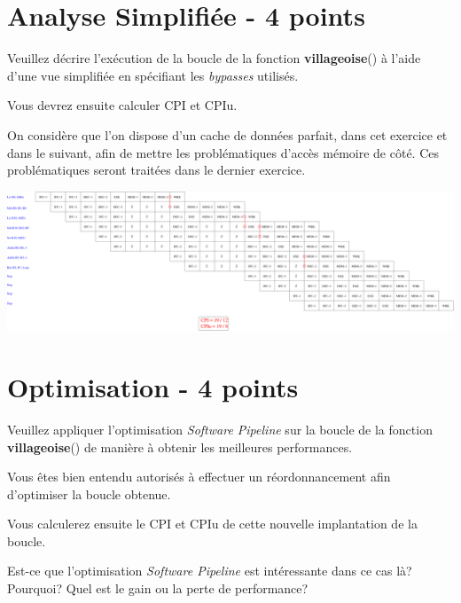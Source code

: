 %
%

\section{Analyse Simplifi\'ee - 4 points}

Veuillez d\'ecrire l'ex\'ecution de la boucle de la fonction
\textbf{villageoise}() \`a l'aide d'une vue simplifi\'ee en sp\'ecifiant les
\textit{bypasses} utilis\'es.

Vous devrez ensuite calculer CPI et CPIu.

On consid\`ere que l'on dispose d'un cache de donn\'ees parfait, dans cet
exercice et dans le suivant, afin de mettre les probl\'ematiques d'acc\`es
m\'emoire de c\^ot\'e. Ces probl\'ematiques seront trait\'ees dans le
dernier exercice.

\begin{correction}

  \begin{center}
    \includegraphics[scale=0.25]{figures/correction-analyse-simplifiee.pdf}
  \end{center}

\end{correction}

%
%

\section{Optimisation - 4 points}

Veuillez appliquer l'optimisation \textit{Software Pipeline} sur
la boucle de la fonction \textbf{villageoise}() de mani\`ere \`a obtenir
les meilleures performances.

Vous \^etes bien entendu autoris\'es \`a effectuer un r\'eordonnancement
afin d'optimiser la boucle obtenue.

Vous calculerez ensuite le CPI et CPIu de cette nouvelle implantation
de la boucle.

Est-ce que l'optimisation \textit{Software Pipeline} est int\'eressante
dans ce cas l\`a? Pourquoi? Quel est le gain ou la perte de performance?

